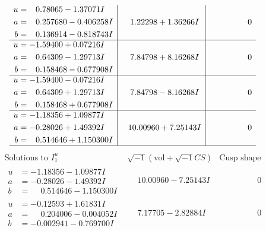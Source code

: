 \documentclass[1p]{elsarticle_modified}
\theoremstyle{definition}
\newcommand{\I}{\sqrt{-1}}
\begin{document}
$$\begin{array}{c|c|c}
\begin{aligned}
u &= \phantom{-}0.78065 - 1.37071 I \\
a &= \phantom{-}0.257680 - 0.406258 I \\
b &= \phantom{-}0.136914 - 0.818743 I\end{aligned}
 & \phantom{-}1.22298 + 1.36266 I & \phantom{-0.000000 } 0 \\ \hline\begin{aligned}
u &= -1.59400 + 0.07216 I \\
a &= \phantom{-}0.64309 - 1.29713 I \\
b &= \phantom{-}0.158468 - 0.677908 I\end{aligned}
 & \phantom{-}7.84798 + 8.16268 I & \phantom{-0.000000 } 0 \\ \hline\begin{aligned}
u &= -1.59400 - 0.07216 I \\
a &= \phantom{-}0.64309 + 1.29713 I \\
b &= \phantom{-}0.158468 + 0.677908 I\end{aligned}
 & \phantom{-}7.84798 - 8.16268 I & \phantom{-0.000000 } 0 \\ \hline\begin{aligned}
u &= -1.18356 + 1.09877 I \\
a &= -0.28026 + 1.49392 I \\
b &= \phantom{-}0.514646 + 1.150300 I\end{aligned}
 & \phantom{-}10.00960 + 7.25143 I & \phantom{-0.000000 } 0\\
 \hline 
 \end{array}$$\newpage$$\begin{array}{c|c|c}  
\text{Solutions to }I^u_{1}& \I (\text{vol} + \sqrt{-1}CS) & \text{Cusp shape}\\
 \hline 
\begin{aligned}
u &= -1.18356 - 1.09877 I \\
a &= -0.28026 - 1.49392 I \\
b &= \phantom{-}0.514646 - 1.150300 I\end{aligned}
 & \phantom{-}10.00960 - 7.25143 I & \phantom{-0.000000 } 0 \\ \hline\begin{aligned}
u &= -0.12593 + 1.61831 I \\
a &= \phantom{-}0.204006 - 0.004052 I \\
b &= -0.002941 - 0.769700 I\end{aligned}
 & \phantom{-}7.17705 - 2.82884 I & \phantom{-0.000000 } 0 \\ \hline\begin{aligned}

\end{aligned}
\end{array}$$
\end{document}
